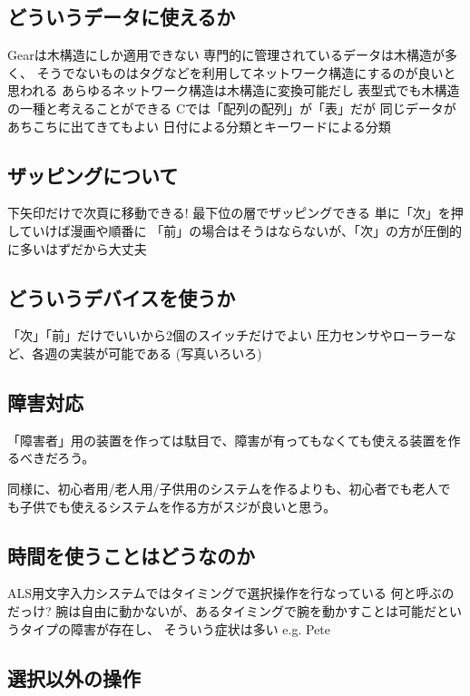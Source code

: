 \documentclass[twoside]{wiss}
\def\GEAR{\textsf{Gear}}
\begin{document}
\subsection*{どういうデータに使えるか}
   {\GEAR}は木構造にしか適用できない
   専門的に管理されているデータは木構造が多く、
   そうでないものはタグなどを利用してネットワーク構造にするのが良いと思われる
   あらゆるネットワーク構造は木構造に変換可能だし
     表型式でも木構造の一種と考えることができる
     Cでは「配列の配列」が「表」だが
   同じデータがあちこちに出てきてもよい
     日付による分類とキーワードによる分類

\subsection*{ザッピングについて}
   下矢印だけで次頁に移動できる!
   最下位の層でザッピングできる
   単に「次」を押していけば漫画や順番に
   「前」の場合はそうはならないが、「次」の方が圧倒的に多いはずだから大丈夫

\subsection*{どういうデバイスを使うか}
  「次」「前」だけでいいから2個のスイッチだけでよい
   圧力センサやローラーなど、各週の実装が可能である
   (写真いろいろ)

\subsection*{障害対応}

「障害者」用の装置を作っては駄目で、障害が有ってもなくても使える装置を作るべきだろう。

同様に、初心者用/老人用/子供用のシステムを作るよりも、初心者でも老人で
も子供でも使えるシステムを作る方がスジが良いと思う。

\subsection*{時間を使うことはどうなのか}

ALS用文字入力システムではタイミングで選択操作を行なっている
  何と呼ぶのだっけ?
  腕は自由に動かないが、あるタイミングで腕を動かすことは可能だというタイプの障害が存在し、
    そういう症状は多い
e.g. Pete

\subsection*{選択以外の操作}
\end{document}
